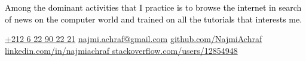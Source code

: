 \documentclass[darkpython]{hipstercv}
\newlength{\rightcolwidth}
\begin{document}
\begin{paracol}{2}
\begin{minipage}[t]{0.65\textwidth}
{	\parbox[b][2.2cm][c]{5cm}{
			\textcolor{black}{Among the dominant activities that I practice is to browse the internet in search of news on the computer world and trained on all the tutorials that interests me.}
		}
	}
\end{minipage}









\vfill{} %

\setlength{\parindent}{0pt}
\begin{minipage}[t]{\rightcolwidth}
\begin{center}\fontfamily{\sfdefault}\selectfont \color{black!70}
{\href{callto:+212622902221}{ \textcolor{black!70}{+212 6 22 90 22 21}} \href{mailto:najmi.achraf@gmail.com}{ \textcolor{black!70}{najmi.achraf@gmail.com}} \href{https://www.github.com/NajmiAchraf}{ \textcolor{black!70}{github.com/NajmiAchraf}} \newline\href{https://www.linkedin.com/in/najmiachraf}{ \textcolor{black!70}{linkedin.com/in/najmiachraf}}\href{https://stackoverflow.com/users/12854948}{ \textcolor{black!70}{stackoverflow.com/users/12854948}}
}
\end{center}\vspace{-2em}
\end{minipage}


\end{paracol}
\end{document}
